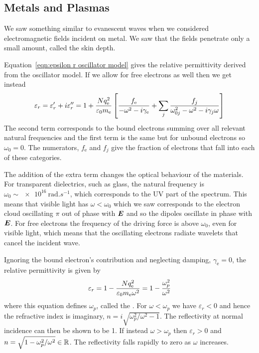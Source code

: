     \subsection{Metals and Plasmas}
    We saw something similar to evanescent waves when we considered electromagnetic fields incident on metal.
    We saw that the fields penetrate only a small amount, called the skin depth.
    
    Equation~\ref{eqn:epsilon r oscillator model} gives the relative permittivity derived from the oscillator model.
    If we allow for free electrons as well then we get instead
    \[\varepsilon_r = \varepsilon_r' + i\varepsilon_r'' = 1 + \frac{Nq_{\mathrm{e}}^2}{\varepsilon_0m_{\mathrm{e}}} \left[ \frac{f_{\mathrm{e}}}{-\omega^2 - i\gamma_{\mathrm{e}}} + \sum_{j} \frac{f_j}{\omega_{0j}^2 - \omega^2 - i\gamma_j\omega} \right]\]
    The second term corresponds to the bound electrons summing over all relevant natural frequencies and the first term is the same but for unbound electrons so \(\omega_0 = 0\).
    The numerators, \(f_{\mathrm{e}}\) and \(f_j\) give the fraction of electrons that fall into each of these categories.
    
    The addition of the extra term changes the optical behaviour of the materials.
    For transparent dielectrics, such as glass, the natural frequency is \(\omega_0 \sim \SI{e16}{\radian.s^{-1}}\), which corresponds to the UV part of the spectrum.
    This means that visible light has \(\omega < \omega_0\) which we saw corresponds to the electron cloud oscillating \(\pi\) out of phase with \(\bm{E}\) and so the dipoles oscillate in phase with \(\bm{E}\).
    For free electrons the frequency of the driving force is above \(\omega_0\), even for visible light, which means that the oscillating electrons radiate wavelets that cancel the incident wave.
    
    Ignoring the bound electron's contribution and neglecting damping, \(\gamma_{\mathrm{e}} = 0\), the relative permittivity is given by
    \[\varepsilon_r = 1 - \frac{Nq_{\mathrm{e}}^2}{\varepsilon_0m_{\mathrm{e}}\omega^2} = 1 - \frac{\omega_p^2}{\omega^2}\]
    where this equation defines \(\omega_p\), called the .
    For \(\omega < \omega_p\) we have \(\varepsilon_r < 0\) and hence the refractive index is imaginary, \(n = i\sqrt{\omega_p^2/\omega^2 - 1}\).
    The reflectivity at normal incidence can then be shown to be 1.
    If instead \(\omega > \omega_p\) then \(\varepsilon_r > 0\) and \(n = \sqrt{1 - \omega_p^2/\omega^2} \in\mathbb{R}\).
    The reflectivity falls rapidly to zero as \(\omega\) increases.


